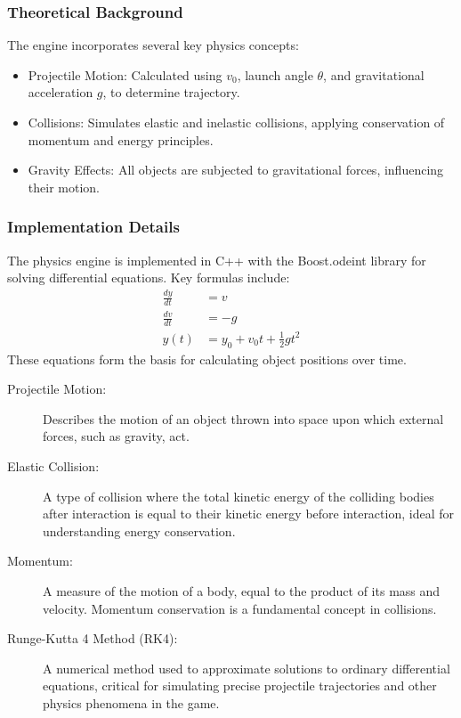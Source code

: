\documentclass[12pt]{article}
\begin{document}
\subsubsection{Theoretical Background}
The engine incorporates several key physics concepts:
\begin{itemize}
    \item Projectile Motion: Calculated using $v_0$, launch angle $\theta$, and gravitational acceleration $g$, to determine trajectory.
    \item Collisions: Simulates elastic and inelastic collisions, applying conservation of momentum and energy principles.
    \item Gravity Effects: All objects are subjected to gravitational forces, influencing their motion.
\end{itemize}

\subsubsection{Implementation Details}
The physics engine is implemented in C++ with the Boost.odeint library for solving differential equations. Key formulas include:
\begin{align}
    \frac{dy}{dt} &= v \\
    \frac{dv}{dt} &= -g \\
    y(t) &= y_0 + v_0t + \frac{1}{2}gt^2
\end{align}
These equations form the basis for calculating object positions over time.


\begin{description}
\item[Projectile Motion:] Describes the motion of an object thrown into space upon which external forces, such as gravity, act.
\item[Elastic Collision:] A type of collision where the total kinetic energy of the colliding bodies after interaction is equal to their kinetic energy before interaction, ideal for understanding energy conservation.
\item[Momentum:] A measure of the motion of a body, equal to the product of its mass and velocity. Momentum conservation is a fundamental concept in collisions.
\item[Runge-Kutta 4 Method (RK4):] A numerical method used to approximate solutions to ordinary differential equations, critical for simulating precise projectile trajectories and other physics phenomena in the game.
\end{description}
\end{document}
